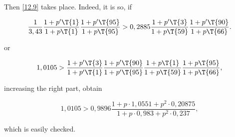 Then \ref{12.9} takes place. Indeed, it is so, if

\begin{equation*}
	\dfrac{1}{3,43}
	\dfrac{1 + p' \T{1}}{1 + p \T{1}}
	\dfrac{1 + p' \T{95}}{1 + p \T{95}}
	>
	0,2885
	\dfrac{1 + p' \T{3}}{1 + p \T{59}}
	\dfrac{1 + p' \T{90}}{1 + p \T{66}}.
\end{equation*}

or

\begin{equation*}
	1,0105
	>
	\dfrac{1 + p' \T{3}}{1 + p' \T{1}}
	\dfrac{1 + p' \T{90}}{1 + p' \T{95}}
	\dfrac{1 + p \T{1}}{1 + p \T{59}}
	\dfrac{1 + p \T{95}}{1 + p \T{66}},
\end{equation*}

increasing the right part, obtain

\begin{equation*}
	1,0105
	>
	0,9896
	\dfrac
	{1 + p \cdot 1,0551 + p^2 \cdot 0,20875}
	{1 + p \cdot 0,983 + p^2 \cdot 0,237},
\end{equation*}

which is easily checked.
